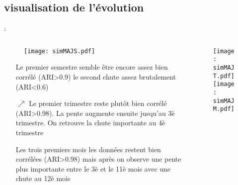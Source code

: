 \documentclass[8pt,aspectratio=169,hyperref={unicode=true}]{beamer}
\begin{document}
\subsection{visualisation de l'évolution}
\begin{frame}{\insertsection: \insertsubsection}
    \begin{columns}[t]
        \begin{column}{.5\textwidth}
            \begin{figure}
                \texttt{[image: simMAJS.pdf]}
            \end{figure}
            \begin{itemize}
                \footnotesize
                \item[\uparrow] Le premier semestre semble être encore assez bien corrélé (ARI>0.9) le second chute assez brutalement (ARI<0.6)
                \item[$\nearrow$] Le premier trimestre reste plutôt bien corrélé (ARI>0.98). La pente augmente ensuite jusqu'au 3è trimestre. On retrouve la chute importante au 4è trimestre
                \item[\rightarrow] Les trois premiers mois les données restent bien corrélées (ARI>0.98) mais après on observe une pente plus importante entre le 3è et le 11è mois avec une chute au 12è mois  
            \end{itemize}
        \end{column}
        \begin{column}{.5\textwidth}
            \begin{figure}
                \texttt{[image: simMAJT.pdf]}
                \texttt{[image: simMAJM.pdf]}
            \end{figure}
        \end{column}
    \end{columns}
\end{frame}
\end{document}
